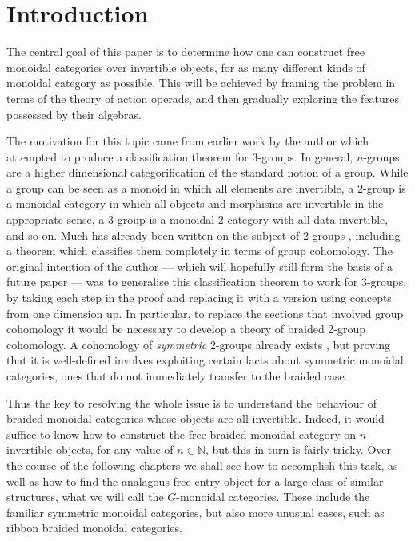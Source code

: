 \chapter{Introduction}
 
The central goal of this paper is to determine how one can construct free monoidal categories over invertible objects, for as many different kinds of monoidal category as possible. This will be achieved by framing the problem in terms of the theory of action operads, and then gradually exploring the features possessed by their algebras.

The motivation for this topic came from earlier work by the author which attempted to produce a classification theorem for 3-groups. In general, $n$-groups are a higher dimensional categorification of the standard notion of a group. While a group can be seen as a monoid in which all elements are invertible, a 2-group is a monoidal category in which all objects and morphisms are invertible in the appropriate sense, a 3-group is a monoidal 2-category with all data invertible, and so on. Much has already been written on the subject of 2-groups \cite{hda5}, including a theorem which classifies them completely in terms of group cohomology. The original intention of the author --- which will hopefully still form the basis of a future paper --- was to generalise this classification theorem to work for 3-groups, by taking each step in the proof and replacing it with a version using concepts from one dimension up. In particular, to replace the sections that involved group cohomology it would be necessary to develop a theory of braided 2-group cohomology. A cohomology of \emph{symmetric} 2-groups already exists \cite{kkg} \cite{picard}, but proving that it is well-defined involves exploiting certain facts about symmetric monoidal categories, ones that do not immediately transfer to the braided case. 

Thus the key to resolving the whole issue is to understand the behaviour of braided monoidal categories whose objects are all invertible. Indeed, it would suffice to know how to construct the free braided monoidal category on $n$ invertible objects, for any value of $n \in \mathbb{N}$, but this in turn is fairly tricky. Over the course of the following chapters we shall see how to accomplish this task, as well as how to find the analagous free entry object for a large class of similar structures, what we will call the $G$-monoidal categories. These include the familiar symmetric monoidal categories, but also more unusual cases, such as ribbon braided monoidal categories. 

